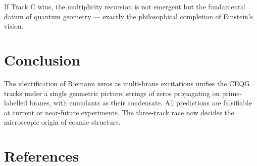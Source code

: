 \documentclass[11pt,a4paper]{article}
\begin{document}
If Track C wins, the multiplicity recursion is not emergent but the fundamental datum of quantum geometry — exactly the philosophical completion of Einstein’s vision.

\section{Conclusion}
The identification of Riemann zeros as multi-brane excitations unifies the CEQG tracks under a single geometric picture: strings of zeros propagating on prime-labelled branes, with cumulants as their condensate. All predictions are falsifiable at current or near-future experiments. The three-track race now decides the microscopic origin of cosmic structure.

\section{References}
\nocite{*}


\clearpage
\end{document}
